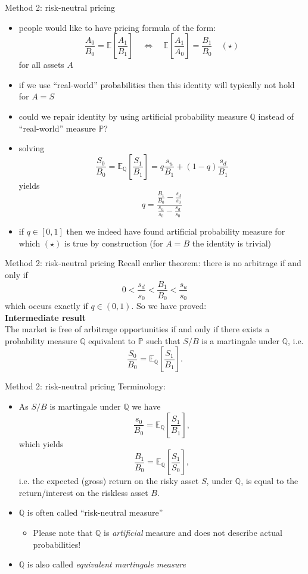 \documentclass[pdf, handout]{beamer}
\begin{document}
\begin{frame}{Method 2: risk-neutral pricing}
\begin{itemize}
\item  people would like to have pricing formula of the form:
\[
\frac{A_0}{B_0} = \mathbb{E}\left[ \frac{A_1}{B_1} \right]\quad   
\Longleftrightarrow\quad
 \mathbb{E}\left[ \frac{A_1}{A_0} \right] =\frac{B_1}{B_0}\quad (\star)
\]
for all assets $A$
\item if we use ``real-world'' probabilities then this identity will
typically not hold for $A=S$
\item could we repair identity by using artificial probability measure $\mathbb{Q}$ instead of ``real-world'' measure $\mathbb{P}$?
\item solving
\[
\frac{S_0}{B_0}=\mathbb{E}_{\mathbb{Q}}
\left[ \frac{S_1}{B_1}\right] = q \frac{s_u}{B_1}  +(1-q) \frac{s_d}{B_1}
\]
yields
\[
q=\frac{\frac{B_1}{B_0}-\frac{s_d}{s_0}    }{ \frac{s_u}{s_0}-\frac{s_d}{s_0}  }
\]
\item if $q\in [0,1]$ then we indeed have found 
artificial probability measure for which $(\star)$ is true by construction
(for $A=B$ the identity is trivial)
\end{itemize}
\end{frame}

\begin{frame}{Method 2: risk-neutral pricing}
Recall earlier theorem: there is no arbitrage if and only if
\[
0<\frac{s_d}{s_0}<\frac{B_1}{B_0}<\frac{s_u}{s_0}
\]
which occurs exactly if $q\in (0,1)$. So we have proved:
\\
\vspace{.3cm}
\textbf{Intermediate result} \\
The market is free of arbitrage opportunities if and only if there exists a probability measure $\mathbb{Q}$ equivalent to $\mathbb{P}$
 such that $S/B$ is a martingale under $\mathbb{Q}$, i.e.
\[ 
 \frac{S_0}{B_0} =\mathbb{E}_{\mathbb{Q}}[ \frac{S_1}{B_1} ].
\]
\end{frame}

\begin{frame}{Method 2: risk-neutral pricing}
Terminology:
\begin{itemize}
\item As $S/B$ is martingale under $\mathbb{Q}$ we have
\[
\frac{s_0}{B_0}=\mathbb{E}_{\mathbb{Q}}\left[ \frac{S_1}{B_1}\right],
\]
which yields
\[
\frac{B_1}{B_0} =\mathbb{E}_{\mathbb{Q}} \left[ \frac{S_1}{S_0} \right] ,
\]
i.e. the expected (gross) return on the risky asset $S$, under $\mathbb{Q}$, is equal to the return/interest on the riskless asset $B$.
\item $\mathbb{Q}$ is often called ``risk-neutral measure''
\begin{itemize}
\item Please note that $\mathbb{Q}$ is \emph{artificial} measure and does not describe actual probabilities!
\end{itemize}
\item $\mathbb{Q}$ is also called \emph{equivalent martingale measure}
\end{itemize}
\end{frame}
\end{document}
